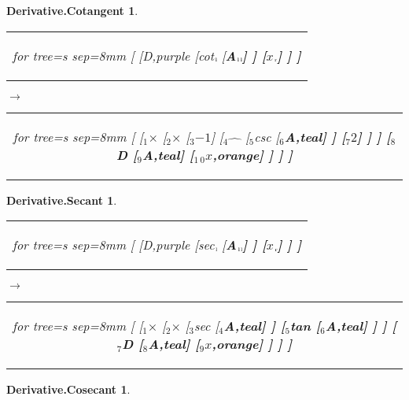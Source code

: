 \documentclass[UTF8,10pt]{ctexart}
\newcommand{\Bigskip}{\bigskip\medskip}
\newcommand{\subtreeA}{\bf A}
\newcommand{\I}{$_{\scriptscriptstyle 1}$}
\newcommand{\II}{$_{\scriptscriptstyle 2}$}
\newcommand{\III}{$_{\scriptscriptstyle 3}$}
\newcommand{\IV}{$_{\scriptscriptstyle 4}$}
\newcommand{\V}{$_{\scriptscriptstyle 5}$}
\newcommand{\VI}{$_{\scriptscriptstyle 6}$}
\newcommand{\VII}{$_{\scriptscriptstyle 7}$}
\newcommand{\VIII}{$_{\scriptscriptstyle 8}$}
\newcommand{\IX}{$_{\scriptscriptstyle 9}$}
\newcommand{\X}{$_{\scriptscriptstyle 1\:\!\!0}$}
\newcommand{\lc}{$_{\:\!\scriptscriptstyle\rm l\!}$}
\newcommand{\rc}{$_{\:\!\scriptscriptstyle\rm r\!}$}
\newcommand{\Derivative}{\rm D}
\newcommand{\x}{$x$}
\newcommand{\NegativeOne}{$-1$}
\newcommand{\Two}{$2$}
\newcommand{\Multiplication}{$\times$}
\newcommand{\Power}{$\hat{\quad}$}
\newcommand{\Tangent}{\rm tan}
\newcommand{\Cotangent}{\rm cot}
\newcommand{\Secant}{\rm sec}
\newcommand{\Cosecant}{\rm csc}
\newtheorem*{Derivative.Cotangent}{\bf Derivative.Cotangent }
\newtheorem*{Derivative.Secant}{\bf Derivative.Secant }
\newtheorem*{Derivative.Cosecant}{\bf Derivative.Cosecant }
\begin{document}
	\begin{center}\vspace*{\fill}
		\begin{Derivative.Cotangent}
			\qquad\par\Bigskip
			\begin{tabular}{c}
				\begin{forest}
					for tree={s sep=8mm}
					[
						[\Derivative,purple
							[\Cotangent\lc
								[\subtreeA\lc\lc]
							]
							[\x\rc]
						]
					]
				\end{forest}
			\end{tabular}
			\qquad
			$\longrightarrow$
			\qquad
			\begin{tabular}{c}
				\begin{forest}
					for tree={s sep=8mm}
					[
						[\I\Multiplication
							[\II\Multiplication
								[\III\NegativeOne]
								[\IV\Power
									[\V\Cosecant
										[\VI\subtreeA,teal]
									]
									[\VII\Two]
								]
							]
							[\VIII\Derivative
								[\IX\subtreeA,teal]
								[\X\x,orange]
							]
						]
					]
				\end{forest}
			\end{tabular}
		\end{Derivative.Cotangent}
		\bigskip
		\begin{Derivative.Secant}
			\qquad\par\Bigskip
			\begin{tabular}{c}
				\begin{forest}
					for tree={s sep=8mm}
					[
						[\Derivative,purple
							[\Secant\lc
								[\subtreeA\lc\lc]
							]
							[\x\rc]
						]
					]
				\end{forest}
			\end{tabular}
			\qquad
			$\longrightarrow$
			\qquad
			\begin{tabular}{c}
				\begin{forest}
					for tree={s sep=8mm}
					[
						[\I\Multiplication
							[\II\Multiplication
								[\III\Secant
									[\IV\subtreeA,teal]
								]
								[\V\Tangent
									[\VI\subtreeA,teal]
								]
							]
							[\VII\Derivative
								[\VIII\subtreeA,teal]
								[\IX\x,orange]
							]
						]
					]
				\end{forest}
			\end{tabular}
		\end{Derivative.Secant}
		\bigskip
		\begin{Derivative.Cosecant}
			\qquad\par\Bigskip

\end{Derivative.Cosecant}
\end{center}
\end{document}
